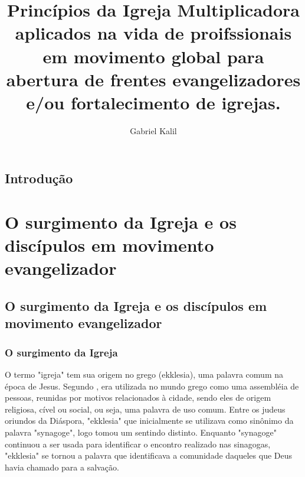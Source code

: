 \documentclass[
	12pt,				%
	openright,			%
	twoside,			%
	a4paper,			%
	english,			%
	french,				%
	spanish,			%
	brazil				%
	]{abntex2}
\title{Princípios da Igreja Multiplicadora aplicados na vida de proifssionais em movimento global para abertura de frentes evangelizadores e/ou fortalecimento de igrejas.}
\author{Gabriel Kalil}
\date{ }
\begin{document}
  
\maketitle
  
\tableofcontents

\section{Introdução}


\chapter{O surgimento da Igreja e os discípulos em movimento evangelizador}



\section{O surgimento da Igreja e os discípulos em movimento evangelizador}
 
\subsection{O surgimento da Igreja}

O termo "igreja" tem sua origem no grego (ekklesia), uma palavra comum na época de Jesus. Segundo \cite[317]{zac}, era utilizada no mundo grego como uma assembléia de pessoas, reunidas por motivos relacionados à cidade, sendo eles de origem religiosa, cível ou social, ou seja, uma palavra de uso comum. Entre os judeus oriundos da Diáspora, "ekklesia" que inicialmente se utilizava como sinônimo da palavra "synagoge", logo tomou um sentindo distinto. Enquanto "synagoge" continuou a ser usada para identificar o encontro realizado nas sinagogas, "ekklesia" se tornou a palavra que identificava a comunidade daqueles que Deus havia chamado para a salvação\cite[485]{bavinck}. 
\end{document}
